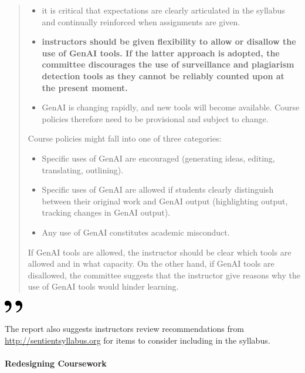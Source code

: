 \documentclass[
]{book}
\begin{document}
\begin{quote}
\begin{itemize}
\item
  it is critical that expectations are clearly articulated in the syllabus and continually reinforced when assignments are given.
\item
  \textbf{instructors should be given flexibility to allow or disallow the use of GenAI tools. If the latter approach is adopted, the committee discourages the use of surveillance and plagiarism detection tools as they cannot be reliably counted upon at the present moment.}
\item
  GenAI is changing rapidly, and new tools will become available. Course policies therefore need to be provisional and subject to change.
\end{itemize}

Course policies might fall into one of three categories:

\begin{itemize}
\item
  Specific uses of GenAI are encouraged (generating ideas, editing, translating, outlining).
\item
  Specific uses of GenAI are allowed if students clearly distinguish between their original work and GenAI output (highlighting output, tracking changes in GenAI output).
\item
  Any use of GenAI constitutes academic misconduct.
\end{itemize}

If GenAI tools are allowed, the instructor should be clear which tools are allowed and in what capacity. On the other hand, if GenAI tools are disallowed, the committee suggests that the instructor give reasons why the use of GenAI tools would hinder learning.
\end{quote}

\includegraphics[width=0.3125in,height=0.20833in]{close.png}

The report also suggests instructors review recommendations from \url{http://sentientsyllabus.org} for items to consider including in the syllabus.

\hypertarget{redesigning-coursework}{%
\paragraph*{Redesigning Coursework}\label{redesigning-coursework}}
\end{document}
